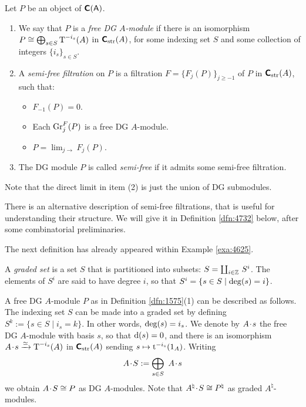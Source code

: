 \begin{dfn} \label{dfn:1575}
Let $P$ be an object of $\boldsymbol{\mathsf{C}}(\operatorname{\mathsf{A}})$. 
\begin{enumerate}
\item We say that $P$ is a {\em free DG $A$-module}%
if there is an isomorphism
$P \cong \bigoplus_{s \in S} \operatorname{T}^{-i_s}(A)$
in $\boldsymbol{\mathsf{C}}_{\mathrm{str}}(A)$, 
for some indexing set $S$ and some collection of integers 
$\{ i_s \}_{s \in S}$. 

\item A {\em semi-free filtration}%
on $P$ is a filtration 
$F = \{ F_j(P) \}_{j \geq -1}$
of $P$ in $\boldsymbol{\mathsf{C}}_{\mathrm{str}}(A)$, such that:
\begin{itemize}
\item $F_{-1}(P) = 0$. 
\item  Each $\operatorname{Gr}^F_j(P)$ is a free DG $A$-module.
\item $P = \lim_{j \to} F_j(P)$.
\end{itemize}

\item The DG module $P$ is called {\em semi-free}%
if it admits some semi-free filtration. 
\end{enumerate}
\end{dfn}

Note that the direct limit in item (2) is just the union of DG submodules.

There is an alternative description of semi-free filtrations, that is useful 
for understanding their structure. We will give it in Definition 
\ref{dfn:4732} below, after some combinatorial preliminaries. 

The next definition has already appeared within Example \ref{exa:4625}.

\begin{dfn} \label{dfn:4730}
A {\em graded set}%
is a set $S$ that is partitioned into subsets: 
$S = \coprod_{i \in \mathbb{Z}} \, S^i$. 
The elements of $S^i$ are said to have degree $i$,
so that $S^i = \{ s \in S \mid \operatorname{deg}(s) = i \}$.
\end{dfn}

A free DG $A$-module $P$ as in Definition \ref{dfn:1575}(1) can be described as 
follows. The indexing set $S$ can be made into a graded set by defining
$S^k := \{ s \in S \mid i_s = k \}$.
In other words, $\operatorname{deg}(s) = i_s$. We denote by $A \mspace{1.5mu}{\cdot}\mspace{1.5mu} s$ the free DG 
$A$-module with basis $s$, so that $\mathrm{d}(s) = 0$, and there is an isomorphism 
$A \mspace{1.5mu}{\cdot}\mspace{1.5mu} s \xrightarrow{\simeq} \operatorname{T}^{-i_s}(A)$ in $\boldsymbol{\mathsf{C}}_{\mathrm{str}}(A)$
sending $s \mapsto \operatorname{t}^{-i_s}(1_A)$. Writing 
\begin{equation} \label{eqn:5062}
A \mspace{1.5mu}{\cdot}\mspace{1.5mu} S := \bigoplus_{s \in S} \ A \mspace{1.5mu}{\cdot}\mspace{1.5mu} s
\end{equation}
we obtain $A \mspace{1.5mu}{\cdot}\mspace{1.5mu} S \cong P$ as DG $A$-modules. 
Note that $A^{\natural} \mspace{1.5mu}{\cdot}\mspace{1.5mu} S \cong P^{\natural}$
as graded $A^{\natural}$-modules. 

